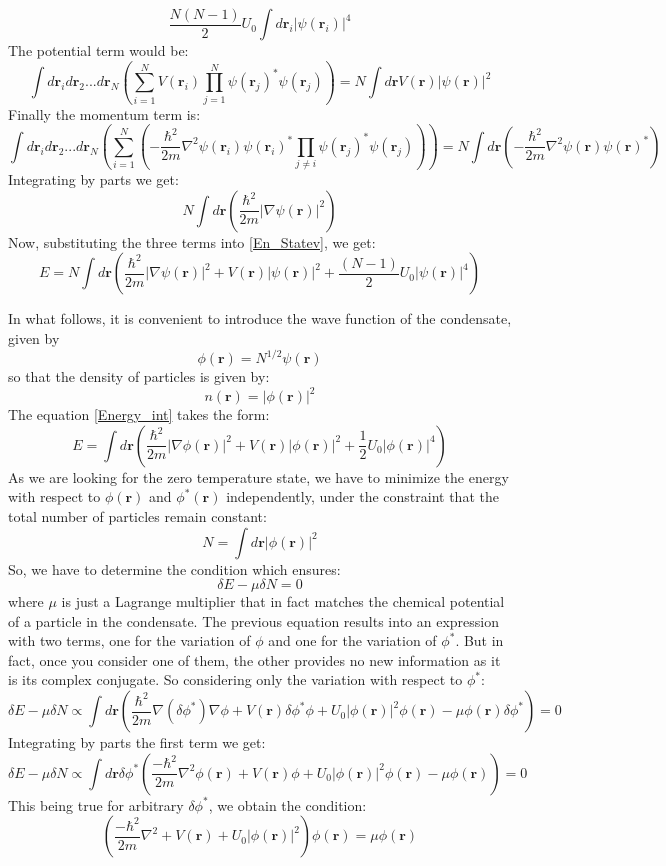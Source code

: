 \documentclass{article}
\begin{document}
$$
 \frac{N(N-1)}{2}U_0\int d\mathbf{r}_i |\psi(\mathbf{r}_i)|^4
$$
The potential term would be:
$$
 \int d\mathbf{r}_i d\mathbf{r}_2 ... d\mathbf{r}_N\left(\sum_{i=1}^{N}V(\mathbf{r}_i)\prod_{j=1}^{N}\psi(\mathbf{r}_j)^{*}\psi(\mathbf{r}_j)\right)=N\int d\mathbf{r} V(\mathbf{r})|\psi(\mathbf{r})|^2
$$
Finally the momentum term is:
$$
 \int d\mathbf{r}_i d\mathbf{r}_2 ... d\mathbf{r}_N \left(\sum_{i=1}^{N}\left(-\frac{\hbar^2}{2m}\nabla^2\psi(\mathbf{r}_i)\psi(\mathbf{r}_i)^{*}\prod_{j\neq i}\psi(\mathbf{r}_j)^{*}\psi(\mathbf{r}_j)\right)\right)=N\int d\mathbf{r} \left(-\frac{\hbar^2}{2m}\nabla^2\psi(\mathbf{r})\psi(\mathbf{r})^{*}\right)
$$
Integrating by parts we get:
$$
 N\int d\mathbf{r} \left(\frac{\hbar^2}{2m}|\nabla\psi(\mathbf{r})|^2\right)
$$
Now, substituting the three terms into \eqref{En_Statev}, we get:
\begin{equation}\label{Energy_int}
 E=N\int d\mathbf{r}\left(\frac{\hbar^2}{2m}|\nabla\psi(\mathbf{r})|^2+V(\mathbf{r})|\psi(\mathbf{r})|^2+\frac{(N-1)}{2}U_0|\psi(\mathbf{r})|^4\right)
\end{equation}

In what follows, it is convenient to introduce the wave function of the condensate, given by 
$$
 \phi(\mathbf{r})=N^{1/2}\psi(\mathbf{r})
$$
so that the density of particles is given by:
$$
 n(\mathbf{r})=|\phi(\mathbf{r})|^2
$$
The equation \eqref{Energy_int} takes the form:
\begin{equation}\label{Energy_cond_wave_f}
 E=\int d\mathbf{r}\left(\frac{\hbar^2}{2m}|\nabla\phi(\mathbf{r})|^2+V(\mathbf{r})|\phi(\mathbf{r})|^2+\frac{1}{2}U_0|\phi(\mathbf{r})|^4\right)
\end{equation}
As we are looking for the zero temperature state, we have to minimize the energy with respect to $\phi(\mathbf{r})$ and $\phi^{*}(\mathbf{r})$ independently, under the constraint that the total number of particles remain constant: 
$$
 N=\int d\mathbf{r}|\phi(\mathbf{r})|^2
$$
So, we have to determine the condition which ensures:
$$
 \delta E- \mu \delta N=0
$$
where $\mu$ is just a Lagrange multiplier that in fact matches the chemical potential of a particle in the condensate. The previous equation results into an expression with two terms, one for the variation of $\phi$ and one for the variation of $\phi^*$. But in fact, once you consider one of them, the other provides no new information as it is its complex conjugate. So considering only the variation with respect to $\phi^*$:
$$
 \delta E-\mu \delta N \propto \int d\mathbf{r} \left(\frac{\hbar^2}{2m}\nabla( \delta \phi^*)\nabla \phi +V(\mathbf{r})\delta \phi^* \phi +U_0 |\phi(\mathbf{r})|^2 \phi(\mathbf{r})-\mu \phi(\mathbf{r}) \delta \phi^*\right)=0
$$
Integrating by parts the first term we get:
$$
 \delta E-\mu \delta N \propto \int d\mathbf{r}\delta \phi^* \left(\frac{-\hbar^2}{2m}\nabla^2 \phi(\mathbf{r}) +V(\mathbf{r}) \phi +U_0 |\phi(\mathbf{r})|^2 \phi(\mathbf{r})-\mu \phi(\mathbf{r})\right)=0
$$
This being true for arbitrary $\delta \phi^*$, we obtain the condition:
\begin{equation}\label{GP_Eq1}
 \left(\frac{-\hbar^2}{2m}\nabla^2 +V(\mathbf{r}) +U_0 |\phi(\mathbf{r})|^2 \right)\phi(\mathbf{r})=\mu \phi(\mathbf{r})
\end{equation}
\end{document}
